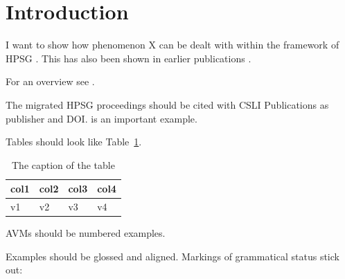 \documentclass[11pt,a4paper,fleqn,draft]{article}
\providecommand{\lsptoprule}{\midrule\toprule}
\providecommand{\lspbottomrule}{\bottomrule\midrule}
\let\citew\citet
\begin{document}

\begin{abstract}
Put the abstract here.
\end{abstract}

\setcounter{footnote}{2}
\renewcommand{\thefootnote}{\fnsymbol{footnote}}
\renewcommand{\thefootnote}{\arabic{footnote}}
\setcounter{footnote}{0}


\section{Introduction}

I want to show how phenomenon X can be dealt with within the framework of HPSG
\citep{PS87a,PS94a}. This has also been shown in earlier publications
\parencites[145]{PS87a}[256]{PS94a}.

For an overview see \citew{BC2021a}.

The migrated HPSG proceedings should be cited with CSLI Publications as publisher and
DOI. \citet{Sag2007a} is an important example.

Tables should look like Table~\ref{table-with-caption}.

\begin{table}[htbp]
\centering
\caption{The caption of the table}\label{table-with-caption}
\begin{tabular}{llll}
\lsptoprule
col1 & col2 & col3 & col4\\
\midrule
v1   & v2   & v3   & v4\\
\lspbottomrule
\end{tabular}
\end{table}

AVMs should be numbered examples.

Examples should be glossed and aligned. Markings of grammatical status stick out:
\eal
{}
\zl

\eal
{}
\zl
\end{document}
